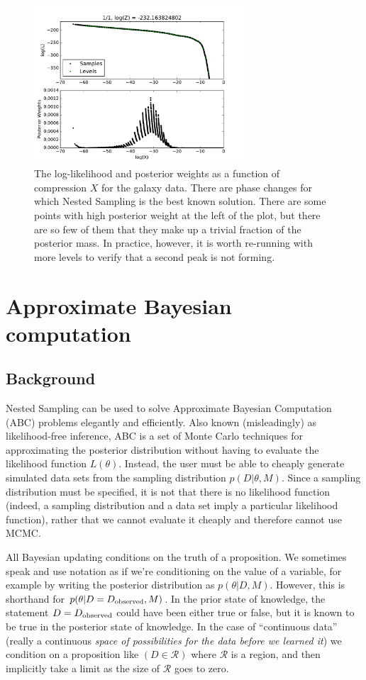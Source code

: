 \documentclass[article, nojss]{jss}
\begin{document}
\begin{figure}[ht!]
\centering
\includegraphics[width=0.7\textwidth]{figures/galaxies_fig3.pdf}
\caption{The log-likelihood and posterior weights as a function
of compression $X$ for the galaxy data. There are phase changes
\citep{skilling2006nested} for which Nested Sampling is the best known
solution. There are some points with high posterior weight at the left
of the plot, but there are so few of them that they make up a trivial
fraction of the posterior mass. In practice, however, it is worth
re-running with more levels to verify that a second peak is not forming.
\label{fig:galaxies_fig3}}
\end{figure}


\section{Approximate Bayesian computation}
\subsection{Background}
Nested Sampling can be used to solve Approximate Bayesian Computation (ABC)
problems elegantly and efficiently.
Also known (misleadingly) as likelihood-free inference,
ABC
is a set of Monte Carlo techniques for approximating the posterior distribution
without having to evaluate the likelihood function $L(\theta)$. Instead, 
the user must be able to cheaply
generate simulated data sets from the sampling distribution $p(D|\theta, M)$.
Since a sampling distribution must be specified, it is not that there is
no likelihood function (indeed, a sampling distribution and
a data set imply a particular likelihood function), rather that we cannot
evaluate it cheaply and therefore cannot use MCMC.

All Bayesian updating conditions on the truth of a proposition. We sometimes
speak and use notation as if we're conditioning on the value of a variable, for
example by writing the posterior distribution as
$p(\theta | D, M)$. However,
this is shorthand for $p(\theta | D = D_{\rm observed}, M)$.
In the prior state of knowledge, the statement
$D = D_{\rm observed}$ could have been either
true or false, but it is known to be true
in the posterior state of knowledge.
In the case of ``continuous data'' (really a continuous {\it space of
possibilities for the data before we learned it}) we condition on a
proposition like $(D \in \mathcal{R})$ where $\mathcal{R}$ is a region, and
then implicitly take a limit as the size of $\mathcal{R}$ goes to zero.
\end{document}
